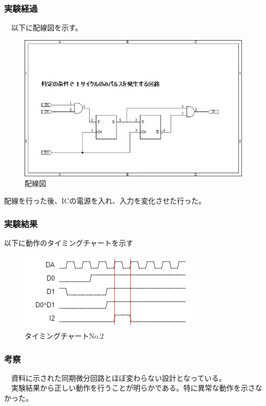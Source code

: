 \documentclass{scrartcl}
\begin{document}
\subsubsection{実験経過}
\label{sec:org5b44647}
　以下に配線図を示す。\\
\begin{figure}[htbp]
\centering
\includegraphics[width=.9\linewidth]{./logice-2.png}
\caption{\label{fig:orgfc1a476}
配線図}
\end{figure}
配線を行った後、ICの電源を入れ、入力を変化させた行った。\\
\subsubsection{実験結果}
\label{sec:org5568dfd}
以下に動作のタイミングチャートを示す\\
\begin{figure}[htbp]
\centering
\includegraphics[width=.9\linewidth]{./logictime-2.png}
\caption{\label{fig:org9cfaf73}
タイミングチャートNo.2}
\end{figure}

\subsubsection{考察}
\label{sec:org0e6d889}
　資料に示された同期微分回路とほぼ変わらない設計となっている。\\
　実験結果から正しい動作を行うことが明らかである。特に異常な動作を示さなかった。\\
\end{document}
